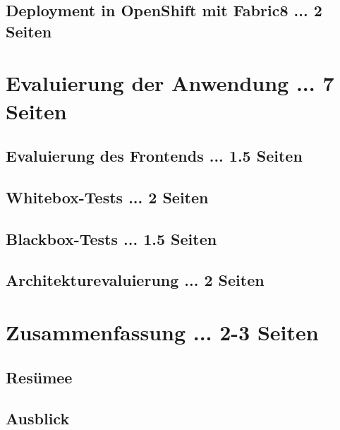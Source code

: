 \documentclass[master,german]{hgbthesis}
\begin{document}
\section{Deployment in OpenShift mit Fabric8 ... 2 Seiten}


\chapter{Evaluierung der Anwendung ... 7 Seiten}
\section{Evaluierung des Frontends ... 1.5 Seiten}
\section{Whitebox-Tests ... 2 Seiten}
\section{Blackbox-Tests ... 1.5 Seiten}
\section{Architekturevaluierung ... 2 Seiten}

\chapter{Zusammenfassung ... 2-3 Seiten}
\section{Resümee}
\section{Ausblick}


\MakeBibliography 

\end{document}
